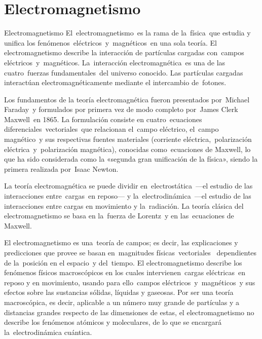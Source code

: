 \part{Electromagnetismo}


\begin{myalertblock}{Electromagnetismo}
	El electromagnetismo es la rama de la física que estudia y unifica los fenómenos eléctricos y magnéticos en una sola teoría. El electromagnetismo describe la interacción de partículas cargadas con campos eléctricos y magnéticos. La interacción electromagnética es una de las cuatro fuerzas fundamentales del universo conocido. Las partículas cargadas interactúan electromagnéticamente mediante el intercambio de fotones. 

\vspace{2mm} %
Los fundamentos de la teoría electromagnética fueron presentados por Michael Faraday y formulados por primera vez de modo completo por James Clerk Maxwell en 1865. La formulación consiste en cuatro ecuaciones diferenciales vectoriales que relacionan el campo eléctrico, el campo magnético y sus respectivas fuentes materiales (corriente eléctrica, polarización eléctrica y polarización magnética), conocidas como ecuaciones de Maxwell, lo que ha sido considerada como la «segunda gran unificación de la física», siendo la primera realizada por Isaac Newton.

\vspace{2mm} %
La teoría electromagnética se puede dividir en electrostática —el estudio de las interacciones entre cargas en reposo— y la electrodinámica —el estudio de las interacciones entre cargas en movimiento y la radiación. La teoría clásica del electromagnetismo se basa en la fuerza de Lorentz y en las ecuaciones de Maxwell.

\vspace{2mm} %
El electromagnetismo es una teoría de campos; es decir, las explicaciones y predicciones que provee se basan en magnitudes físicas vectoriales  dependientes de la posición en el espacio y del tiempo. El electromagnetismo describe los fenómenos físicos macroscópicos en los cuales intervienen cargas eléctricas en reposo y en movimiento, usando para ello campos eléctricos y magnéticos y sus efectos sobre las sustancias sólidas, líquidas y gaseosas. Por ser una teoría macroscópica, es decir, aplicable a un número muy grande de partículas y a distancias grandes respecto de las dimensiones de estas, el electromagnetismo no describe los fenómenos atómicos y moleculares, de lo que se encargará la electrodinámica cuántica.


\end{myalertblock}
